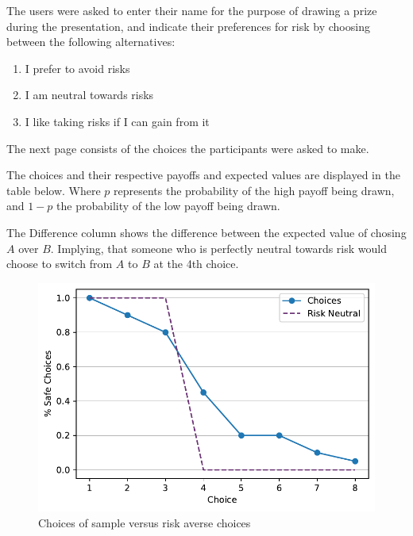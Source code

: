 \documentclass [12pt,a4paper,oneside]{article}
\begin{document}
The users were asked to enter their name for the purpose of drawing a prize during the presentation, and indicate their preferences for risk by choosing between the following alternatives:

\begin{enumerate}
  \item I prefer to avoid risks
  \item I am neutral towards risks
  \item I like taking risks if I can gain from it
\end{enumerate}

The next page consists of the choices the participants were asked to make. 

The choices and their respective payoffs and expected values are displayed in the table below. Where $p$ represents the probability of the high payoff being drawn, and $1-p$ the probability of the low payoff being drawn. 

The Difference column shows the difference between the expected value of chosing $A$ over $B$. Implying, that someone who is perfectly neutral towards risk would choose to switch from $A$ to $B$ at the 4th choice. 






\begin{figure}[H]
  \centering
  \includegraphics{graphics/aggregate_plot.pdf}
  \caption{Choices of sample versus risk averse choices}
\end{figure}
\end{document}
